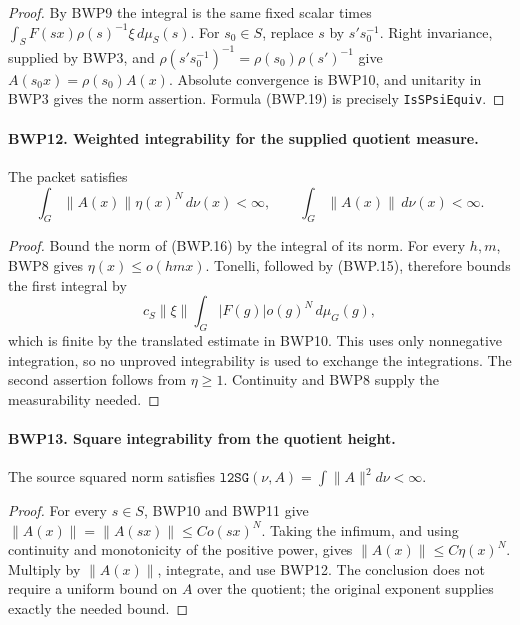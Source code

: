 \documentclass[11pt,a4paper]{article}
\numberwithin{equation}{section}
\theoremstyle{remark}\newtheorem{remark}[theorem]{Remark}
\begin{document}
\begin{proof}
By BWP9 the integral is the same fixed scalar times
\(\int_S F(sx)\rho(s)^{-1}\xi\,d\mu_S(s)\).
For \(s_0\in S\), replace \(s\) by \(s's_0^{-1}\).
Right invariance, supplied by BWP3, and
\(\rho(s's_0^{-1})^{-1}=\rho(s_0)\rho(s')^{-1}\)
give \(A(s_0x)=\rho(s_0)A(x)\).
Absolute convergence is BWP10, and unitarity in BWP3 gives the norm
assertion.  Formula (BWP.19) is precisely \texttt{Is\allowbreak SPsi\allowbreak Equiv}.
\end{proof}

\paragraph{BWP12. Weighted integrability for the supplied quotient measure.}
\label{claim:BWP12}
The packet satisfies
\[
 \int_G\|A(x)\|\eta(x)^N\,d\nu(x)<\infty,
 \qquad \int_G\|A(x)\|\,d\nu(x)<\infty.
 \tag{BWP.20}
\]

\begin{proof}
Bound the norm of (BWP.16) by the integral of its norm.  For every
\(h,m\), BWP8 gives \(\eta(x)\le o(hmx)\).
Tonelli, followed by (BWP.15), therefore bounds the first integral by
\[
 c_S\|\xi\|\int_G |F(g)|o(g)^N\,d\mu_G(g),
\]
which is finite by the translated estimate in BWP10.  This uses only
nonnegative integration, so no unproved integrability is used to
exchange the integrations.  The second assertion follows from
\(\eta\ge1\).  Continuity and BWP8 supply the measurability needed.
\end{proof}

\paragraph{BWP13. Square integrability from the quotient height.}
\label{claim:BWP13}
The source squared norm satisfies
\(\texttt{l2SG}(\nu,A)=\int\|A\|^2d\nu<\infty\).

\begin{proof}
For every \(s\in S\), BWP10 and BWP11 give
\(\|A(x)\|=\|A(sx)\|\le C o(sx)^N\).
Taking the infimum, and using continuity and monotonicity of the
positive power, gives \(\|A(x)\|\le C\eta(x)^N\).
Multiply by \(\|A(x)\|\), integrate, and use BWP12.
The conclusion does not require a uniform bound on \(A\) over
the quotient; the original exponent supplies exactly the needed bound.
\end{proof}

\end{document}
